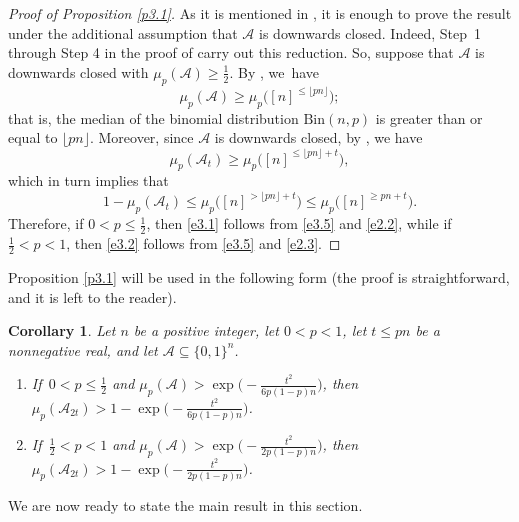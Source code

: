 \documentclass[10pt,a4paper]{amsart}
\newtheorem{cor}[thm]{Corollary}
\theoremstyle{remark}
\newcommand{\meg}{\geqslant}
\newcommand{\mik}{\leqslant}
\newcommand{\Acal}{\mathcal{A}}
\newcommand{\pmeasure}[1]{\ensuremath{\mu_{p}\left(#1\right)}}
\begin{document}
\begin{proof}[Proof of Proposition \emph{\ref{p3.1}}]
As it is mentioned in \cite{BHT06}, it is enough to prove the result under the additional assumption that
$\Acal$ is downwards closed. Indeed, Step~1 through Step 4 in the proof
of \cite[Theorem 7]{Ta89} carry out this reduction. So, suppose that $\Acal$ is downwards closed
with $\pmeasure{\Acal}\meg \frac12$. By \cite[Theorem 3.2 and Corollary 3.1]{JS68},
we~have
\begin{equation} \label{e3.3}
\pmeasure{\Acal}\meg \mu_p\big([n]^{\mik \lfloor pn \rfloor}\big);
\end{equation}
that is, the median of the binomial distribution $\mathrm{Bin}(n,p)$ is greater than or equal to $\lfloor pn \rfloor$.
Moreover, since $\Acal$ is downwards closed, by \cite[Corollary 5]{BL91}, we have
\begin{equation} \label{e3.4}
\pmeasure{\Acal_t}\meg \mu_p\big([n]^{\mik \lfloor pn \rfloor+t}\big),
\end{equation}
which in turn implies that
\begin{equation} \label{e3.5}
1-\pmeasure{\Acal_t}\mik
\mu_p\big([n]^{>\lfloor pn\rfloor +t}\big)\mik \mu_p\big([n]^{\meg pn +t}\big).
\end{equation}
Therefore, if $0<p\mik \frac12$, then \eqref{e3.1} follows from \eqref{e3.5} and \eqref{e2.2},
while if $\frac12< p<1$, then \eqref{e3.2} follows from \eqref{e3.5} and \eqref{e2.3}.
\end{proof}
Proposition \ref{p3.1} will be used in the following form (the proof is straightforward, and it is left
to the reader).
\begin{cor} \label{c3.2}
Let $n$ be a positive integer, let $0<p<1$, let $t\mik pn$ be a nonnegative real, and let
$\Acal\subseteq \{0,1\}^n$.
\begin{enumerate}
\item[(i)] If\, $0<p\mik \frac12$ and $\pmeasure{\Acal}>\exp\big(-\frac{t^2}{6p(1-p)n}\big)$,
then $\pmeasure{\Acal_{2t}}>1-\exp\big(-\frac{t^2}{6p(1-p)n}\big)$.
\item[(ii)] If\, $\frac12<p<1$ and $\pmeasure{\Acal}>\exp\big(-\frac{t^2}{2p(1-p)n}\big)$,
then $\pmeasure{\Acal_{2t}}>1-\exp\big(-\frac{t^2}{2p(1-p)n}\big)$.
\end{enumerate}
\end{cor}
We are now ready to state the main result in this section.
\end{document}
